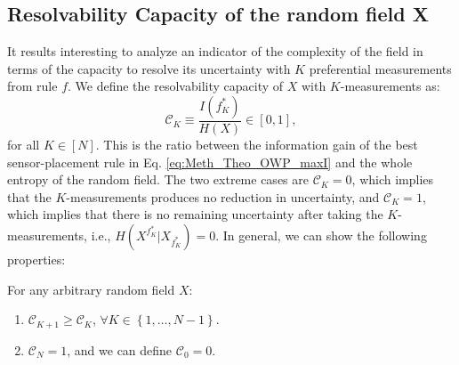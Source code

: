 \subsection{Resolvability Capacity of the random field X } %

It results interesting to analyze an indicator of the complexity of the field in terms of the capacity to resolve its uncertainty with $K$ preferential measurements from rule $f$. We define the resolvability capacity of $X$ with $K$-measurements as: 
\begin{equation}\label{eq:Meth_Theo_Ck}
	\mathcal{C}_{K} \equiv \frac{I(f^{*}_{K})}{H(X)} \in [0,1],  
\end{equation}
for all $K \in [N]$. This is the ratio between the information gain of the best sensor-placement rule in Eq. \eqref{eq:Meth_Theo_OWP_maxI} and the whole entropy of the random field. The two extreme cases are $\mathcal{C}_{K}=0$, which implies that the $K$-measurements produces no reduction in uncertainty, and $\mathcal{C}_{K}=1$, which implies that there is no remaining uncertainty after taking the $K$-measurements, i.e., $H(X^{f^{*}_{K}}|X_{f^{*}_{K}}) = 0$. In general, we can show the following properties:

\begin{proposition}\label{pro_resol_C} For any arbitrary random field $X$:
	\begin{enumerate}
		\item  $\mathcal{C}_{K+1} \geq  \mathcal{C}_{K}$, $\forall K \in \left\{  1, \ldots ,N -1\right\}$. 
		\item  $\mathcal{C}_{N}=1$, and we can define $\mathcal{C}_{0}=0$. 
	\end{enumerate}
\end{proposition}

